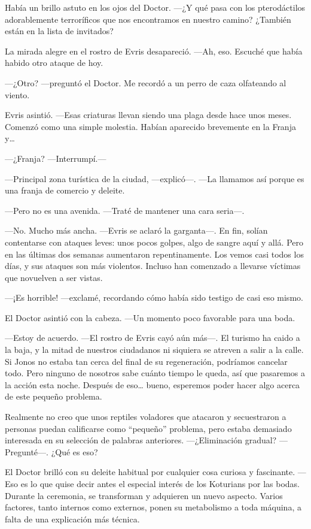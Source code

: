 Había un brillo astuto en los ojos del Doctor. ---¿Y qué pasa con los
pterodáctilos adorablemente terroríficos que nos encontramos en nuestro
camino? ¿También están en la lista de invitados?

La mirada alegre en el rostro de Evris desapareció. ---Ah, eso. Escuché
que había habido otro ataque de hoy.

---¿Otro? ---preguntó el Doctor. Me recordó a un perro de caza
olfateando al viento.

Evris asintió. ---Esas criaturas llevan siendo una plaga desde hace unos
meses. Comenzó como una simple molestia. Habían aparecido brevemente en
la Franja y\ldots{}

---¿Franja? ---Interrumpí.---

---Principal zona turística de la ciudad, ---explicó---. ---La llamamos
así porque es una franja de comercio y deleite.

---Pero no es una avenida. ---Traté de mantener una cara seria---.

---No. Mucho más ancha. ---Evris se aclaró la garganta---. En fin,
solían contentarse con ataques leves: unos pocos golpes, algo de sangre
aquí y allá. Pero en las últimas dos semanas aumentaron repentinamente.
Los vemos casi todos los días, y sus ataques son más violentos. Incluso
han comenzado a llevarse víctimas que novuelven a ser vistas.

---¡Es horrible! ---exclamé, recordando cómo había sido testigo de casi
eso mismo.

El Doctor asintió con la cabeza. ---Un momento poco favorable para una
boda.

---Estoy de acuerdo. ---El rostro de Evris cayó aún más---. El turismo
ha caido a la baja, y la mitad de nuestros ciudadanos ni siquiera se
atreven a salir a la calle. Si Jonos no estaba tan cerca del final de su
regeneración, podríamos cancelar todo. Pero ninguno de nosotros sabe
cuánto tiempo le queda, así que pasaremos a la acción esta noche.
Después de eso\ldots{} bueno, esperemos poder hacer algo acerca de este
pequeño problema.

Realmente no creo que unos reptiles voladores que atacaron y
secuestraron a personas puedan calificarse como ``pequeño'' problema,
pero estaba demasiado interesada en su selección de palabras anteriores.
---¿Eliminación gradual? ---Pregunté---. ¿Qué es eso?

El Doctor brilló con su deleite habitual por cualquier cosa curiosa y
fascinante. ---Eso es lo que quise decir antes el especial interés de
los Koturians por las bodas. Durante la ceremonia, se transforman y
adquieren un nuevo aspecto. Varios factores, tanto internos como
externos, ponen su metabolismo a toda máquina, a falta de una
explicación más técnica.

